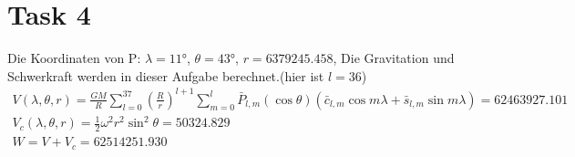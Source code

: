 \documentclass[12pt]{article}
\begin{document}
\begin{figure}[ht]
\end{figure}
\newpage
\section{Task 4}
Die Koordinaten von P: $\lambda = 11°$, $\theta = 43°$, $r = 6379245.458$, Die Gravitation und Schwerkraft werden in dieser Aufgabe berechnet.(hier ist $l=36$)
\begin{gather*}
V(\lambda,\theta,r) = \frac{GM}{R}\sum_{l=0}^{37}(\frac{R}{r})^{l+1}\sum_{m=0}^{l}\bar{P}_{l,m}(\cos \theta)(\bar{c}_{l,m} \cos m \lambda + \bar{s}_{l,m} \sin m \lambda) = 62463927.101\\
V_c(\lambda,\theta,r) = \frac{1}{2} \omega^2 r^2 \sin^2 \theta = 50324.829\\
W = V + V_c = 62514251.930
\end{gather*}
\end{document}
